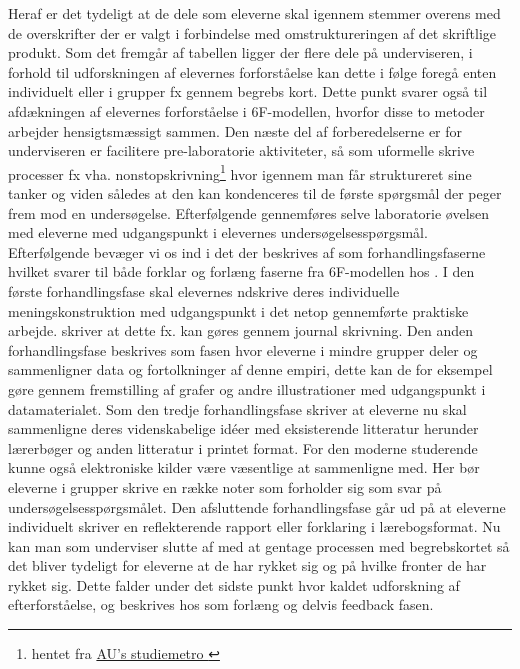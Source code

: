 Heraf er det tydeligt at de dele som eleverne skal igennem stemmer overens med de overskrifter der er valgt i forbindelse med omstruktureringen af det skriftlige produkt. Som det fremgår af tabellen ligger der flere dele på underviseren, i forhold til udforskningen af elevernes forforståelse kan dette i følge \citet{Hand2004} foregå enten individuelt eller i grupper fx gennem begrebs kort. Dette punkt svarer også til afdækningen af elevernes forforståelse i 6F-modellen, hvorfor disse to metoder arbejder hensigtsmæssigt sammen. Den næste del af forberedelserne er for underviseren er facilitere pre-laboratorie aktiviteter, så som uformelle skrive processer fx vha. nonstopskrivning\footnote{hentet fra \href{http://studypedia.au.dk/fileadmin/www.studiemetro.au.dk/Pink__At_skrive_universitetsopgaver/nonstop/nonstop.html}{AU's studiemetro }} hvor igennem man får struktureret sine tanker og viden således at den kan kondenceres til de første spørgsmål der peger frem mod en undersøgelse. Efterfølgende gennemføres selve laboratorie øvelsen med eleverne med udgangspunkt i elevernes undersøgelsesspørgsmål. Efterfølgende bevæger vi os ind i det der beskrives af \citet{Keys1999,Hand2004} som forhandlingsfaserne hvilket svarer til både forklar og forlæng faserne fra 6F-modellen hos \citep{Dolin2014}. I den første forhandlingsfase skal elevernes ndskrive deres individuelle meningskonstruktion med udgangspunkt i det netop gennemførte praktiske arbejde. \citet{Hand2004} skriver at dette fx. kan gøres gennem journal skrivning. Den anden forhandlingsfase beskrives som fasen hvor eleverne i mindre grupper deler og sammenligner data og fortolkninger af denne empiri, dette kan de for eksempel gøre gennem fremstilling af grafer og andre illustrationer med udgangspunkt i datamaterialet. Som den tredje forhandlingsfase skriver \citet{Hand2004} at eleverne nu skal sammenligne deres videnskabelige idéer med eksisterende litteratur herunder lærerbøger og anden litteratur i printet format. For den moderne studerende kunne også elektroniske kilder være væsentlige at sammenligne med. Her bør eleverne i grupper skrive en række noter som forholder sig som svar på undersøgelsesspørgsmålet. Den afsluttende forhandlingsfase går ud på at eleverne individuelt skriver en reflekterende rapport eller forklaring i lærebogsformat.
Nu kan man som underviser slutte af med at gentage processen med begrebskortet så det bliver tydeligt for eleverne at de har rykket sig og på hvilke fronter de har rykket sig. Dette falder under det sidste punkt hvor kaldet udforskning af efterforståelse, og beskrives hos \citet{Dolin2014} som forlæng og delvis feedback fasen.

